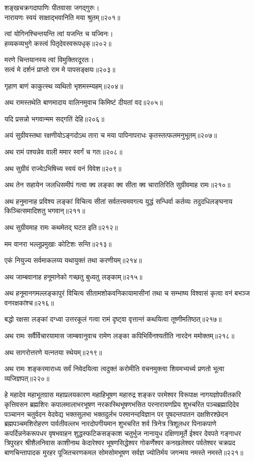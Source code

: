 \begin{flushleft}
शङ्खचक्रगदापाणिः पीतवासा जगद्गुरुः।\\
नारायणः स्वयं साक्षाद्भवानिति मया श्रुतम्॥२०१॥

त्वां योगिनश्चिन्तयन्ति त्वां यजन्ति च यज्विनः।\\
हव्यकव्यभुगे कस्त्वं पितृदेवस्वरूपधृक्॥२०२॥

मरणे चिन्तयानस्य त्वां विमुक्तिरदूरतः।\\
सत्वं मे दर्शनं प्राप्तो राम मे पापसङ्क्षयः॥२०३॥

गृहाण बाणं काकुत्स्थ व्यथितो भृशमस्म्यहम्॥२०४॥

अथ रामस्तथेति बाणमादाय वालिनमुवाच किमिष्टं दीयतां वद॥२०५॥


यदि प्रसन्नो भगवान्मम सद्गतिं देहि॥२०६॥

अयं सुग्रीवस्तथा रक्षणीयोऽङ्गदोऽथ तारा च मया पापिनापराधः कृतस्तत्फलमनुभूतम्॥२०७॥

अथ रामं पश्यन्नेव वाली ममार स्वर्गं च गतः॥२०८॥

अथ सुग्रीवं राज्येऽभिषिच्य स्वयं वनं विवेश॥२०९॥

अथ तेन सहायेन जलधिसमीपं गत्वा क्व लङ्का क्व सीता क्व चारातिरिति सुग्रीवमाह रामः॥२१०॥

अथ हनुमानाह प्रविश्य लङ्कां विचित्य सीतां सर्वतत्त्वमवगत्य युद्धं सन्धिर्वा कर्तव्यः तदुदधिलङ्घनाय किञ्चित्समादिशतु भगवान्॥२११॥

अथ सुग्रीवमाह रामः कथमेतद् घटत इति॥२१२॥


मम वानरा भल्लूप्रमुखाः कोटिशः सन्ति॥२१३॥

एकं नियुज्य सर्वमाकलय्य यथायुक्तं तथा करणीयम्॥२१४॥

अथ जाम्बवानाह हनूमानेको गच्छतु बुध्यतु लङ्काम्॥२१५॥

अथ हनूमानगमल्लङ्कापुरं विचित्य सीतामशोकवनिकायामासीनां तथा च सम्भाष्य विश्वासं कृत्वा वनं बभञ्ज वनरक्षकांश्च॥२१६॥

बद्धो रक्षसा लङ्कां दग्ध्वा उत्तरकूलं गत्वा रामं दृष्ट्वा वृत्तान्तं कथयित्वा तूष्णीमतिष्ठत्॥२१७॥

अथ रामः सर्वैर्विचारयामास जाम्बवानुवाच रामेण लङ्का कपिभिर्विनश्यतीति नारदेन ममोक्तम्॥२१८॥

अथ सागरोत्तरणे यत्नतया स्थेयम्॥२१९॥

अथ रामः शङ्करमाराध्य सर्वं निवेदयित्वा त्वदुक्तं करोमीति वचनमुक्त्वा शिवमभ्यर्च्य प्रणतो भूत्वा व्यजिज्ञपत्॥२२०॥

हे महादेव महाभूतग्रास महाप्रलयकारण महाहिभूषण महारुद्र शङ्कर परमेश्वर विरूपाक्ष नागयज्ञोपवीतकरि कृत्तिवसन ब्रह्मशिरः कपालमालाभरभूषण नरकास्थिभूषणभसित परनारायणप्रिय शुभचरित पञ्चब्रह्मादिदेव पञ्चानन चतुर्वदन वेदवेद्य भक्तसुलभा भक्तदुर्लभ परमानन्दविज्ञान पर पूषदन्तपातन दक्षशिरश्छेदन ब्रह्मपञ्चमशिरोहरण पार्वतीवल्लभ नारदोपगीयमान शुभचरित शर्व त्रिनेत्र त्रिशूलधर पिनाकपाणे कपर्दिन्ननेकरूपधर वृषभवाहन शुद्धस्फटिकसङ्काश चतुर्भुज नानायुध दक्षिणामूर्ते ईश्वर देवपते गङ्गाधर त्रिपुरहर श्रीशैलनिवास काशीनाथ केदारेश्वर भूषणसिद्धेश्वर गोकर्णेश्वर कनखलेश्वर पर्वतेश्वर चक्रप्रद बाणचिन्तापादक मुरहर पूजितचरणकमल सोमसोमभूषण सर्वज्ञ ज्योतिर्मय जगन्मय नमस्ते नमस्ते॥२२१॥


\end{flushleft}
